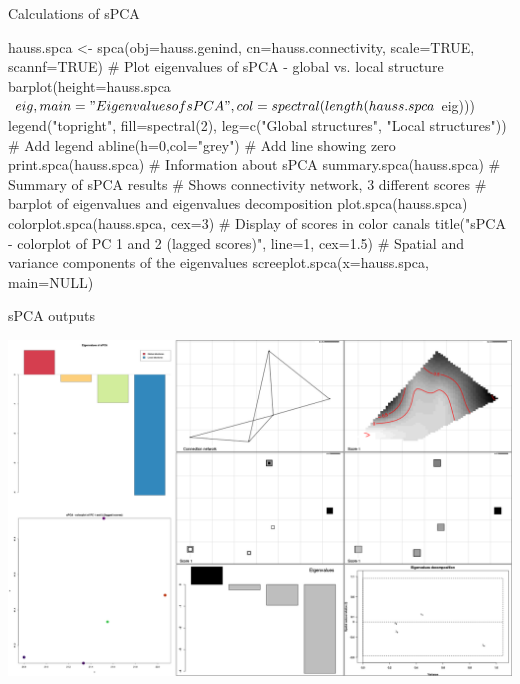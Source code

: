 \documentclass[compress, ucs, xelatex, 11pt, xcolor=svgnames,
  hyperref={
    bookmarks=true,
    unicode=true,
    colorlinks=true,
    pdftitle={Molecular data in R},
    plainpages=false,
    pdfauthor={Vojtech Zeisek},
    pdfsubject={Course about phylogeny and evolution in R},
    pdfcreator={XeLaTeX},
    pdfkeywords={R, evolution, phylogeny, molecular data},
    linkcolor=Tomato,
    anchorcolor=SaddleBrown,
    citecolor=Goldenrod,
    filecolor=DarkMagenta,
    menucolor=Sienna,
    urlcolor=DarkTurquoise,
    pdftex},
  url={hyphens, lowtilde} %
  ]{beamer}
\begin{document}
\begin{frame}[fragile]{Calculations of sPCA}
  \begin{spluscode}
    hauss.spca <- spca(obj=hauss.genind, cn=hauss.connectivity,
      scale=TRUE, scannf=TRUE)
    # Plot eigenvalues of sPCA - global vs. local structure
    barplot(height=hauss.spca$eig, main="Eigenvalues of sPCA",
      col=spectral(length(hauss.spca$eig)))
    legend("topright", fill=spectral(2), leg=c("Global structures",
      "Local structures")) # Add legend
    abline(h=0,col="grey") # Add line showing zero
    print.spca(hauss.spca) # Information about sPCA
    summary.spca(hauss.spca) # Summary of sPCA results
    # Shows connectivity network, 3 different scores
    # barplot of eigenvalues and eigenvalues decomposition
    plot.spca(hauss.spca)
    colorplot.spca(hauss.spca, cex=3) # Display of scores in color canals
    title("sPCA - colorplot of PC 1 and 2 (lagged scores)", line=1, cex=1.5)
    # Spatial and variance components of the eigenvalues
    screeplot.spca(x=hauss.spca, main=NULL)
  \end{spluscode}
\end{frame}

\begin{frame}{sPCA outputs}
\begin{center}
  \includegraphics[width=\textwidth-1.5cm]{spca.png}
\end{center}
\end{frame}
\end{document}
